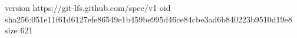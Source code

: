 version https://git-lfs.github.com/spec/v1
oid sha256:051e11f61d6127efe86549e1b459be995d46ce84cbe3ad6b840223b9510d19e8
size 621
